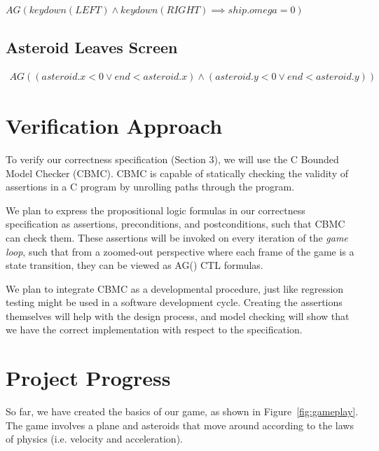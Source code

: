 \documentclass{article}
\begin{document}
        $AG(keydown(LEFT) \land keydown(RIGHT) \implies ship.omega = 0)$
	
	\subsection{Asteroid Leaves Screen}
	
		\begin{align*}
			AG((asteroid.x < 0 \lor end < asteroid.x) \land 
			(asteroid.y < 0 \lor end < asteroid.y))
		\end{align*}

\section{Verification Approach}

    To verify our correctness specification (Section 3), we will use the C
    Bounded Model Checker (CBMC). CBMC is capable of statically checking the
    validity of assertions in a C program by unrolling paths through the
    program.

    We plan to express the propositional logic formulas in our correctness
    specification as assertions, preconditions, and postconditions, such that
    CBMC can check them. These assertions will be invoked on every iteration of
    the \textit{game loop}, such that from a zoomed-out perspective where each
    frame of the game is a state transition, they can be viewed as AG() CTL
    formulas.

	We plan to integrate CBMC as a developmental procedure, just like regression testing might be used in a software development cycle.
	Creating the assertions themselves will help with the design process, and model checking will show that we have the correct implementation with respect to the specification.

\section{Project Progress}
So far, we have created the basics of our game, as shown in Figure~\ref{fig:gameplay}.
The game involves a plane and asteroids that move around according to the laws of physics (i.e. velocity and acceleration).
\end{document}
